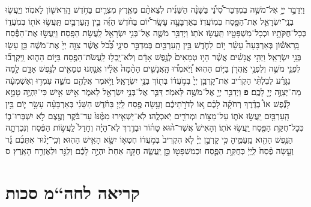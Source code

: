 \documentclass[twoside, openany, parskip=half, 11pt]{book}
\begin{document}
\begin{footnotesize}
\begin{multicols}{2}
\\
\\
וַיְדַבֵּ֣ר יְיָ֣ אֶל־מֹשֶׁ֣ה בְמִדְבַּר־סִ֠ינַ֠י בַּשָּׁנָ֨ה הַשֵּׁנִ֜ית לְצֵאתָ֨ם מֵאֶ֧רֶץ מִצְרַ֛יִם בַּחֹ֥דֶשׁ הָֽרִאשׁ֖וֹן לֵאמֹֽר׃ וְיַֽעֲשׂ֧וּ בְנֵֽי־יִשְׂרָאֵ֛ל אֶת־הַפָּ֖סַח בְּמֽוֹעֲדֽוֹ׃ בְּאַרְבָּעָ֣ה עָשָֽׂר־י֠וֹם בַּחֹ֨דֶשׁ הַזֶּ֜ה בֵּ֧ין הָֽעַרְבַּ֛יִם תַּֽעֲשׂ֥וּ אֹת֖וֹ בְּמֹֽעֲד֑וֹ כְּכָל־חֻקֹּתָ֥יו וּכְכָל־מִשְׁפָּטָ֖יו תַּֽעֲשׂ֥וּ אֹתֽוֹ׃ וַיְדַבֵּ֥ר מֹשֶׁ֛ה אֶל־בְּנֵ֥י יִשְׂרָאֵ֖ל לַֽעֲשׂ֥ת הַפָּֽסַח׃ וַיַּֽעֲשׂ֣וּ אֶת־הַפֶּ֡סַח בָּֽרִאשׁ֡וֹן בְּאַרְבָּעָה֩ עָשָׂ֨ר י֥וֹם לַחֹ֛דֶשׁ בֵּ֥ין הָֽעַרְבַּ֖יִם בְּמִדְבַּ֣ר סִינָ֑י כְּ֠כֹ֠ל אֲשֶׁ֨ר צִוָּ֤ה יְיָ֙ אֶת־מֹשֶׁ֔ה כֵּ֥ן עָשׂ֖וּ בְּנֵ֥י יִשְׂרָאֵֽל׃ 
וַיְהִ֣י אֲנָשִׁ֗ים אֲשֶׁ֨ר הָי֤וּ טְמֵאִים֙ לְנֶ֣פֶשׁ אָדָ֔ם וְלֹא־יָֽכְל֥וּ לַֽעֲשֹׂת־הַפֶּ֖סַח בַּיּ֣וֹם הַה֑וּא וַֽיִּקְרְב֞וּ לִפְנֵ֥י מֹשֶׁ֛ה וְלִפְנֵ֥י אַֽהֲרֹ֖ן בַּיּ֥וֹם הַהֽוּא׃ וַ֠יֹּֽאמְר֠וּ הָֽאֲנָשִׁ֤ים הָהֵ֨מָּה֙ אֵלָ֔יו אֲנַ֥חְנוּ טְמֵאִ֖ים לְנֶ֣פֶשׁ אָדָ֑ם לָ֣מָּה נִגָּרַ֗ע לְבִלְתִּ֨י הַקְרִ֜יב אֶת־קָרְבַּ֤ן יְיָ֙ בְּמֹ֣עֲד֔וֹ בְּת֖וֹךְ בְּנֵ֥י יִשְׂרָאֵֽל׃ וַיֹּ֥אמֶר אֲלֵהֶ֖ם מֹשֶׁ֑ה עִמְד֣וּ וְאֶשְׁמְעָ֔ה מַה־יְּצַוֶּ֥ה יְיָ֖ לָכֶֽם׃ \textbf{פ} 
וַיְדַבֵּ֥ר יְיָ֖ אֶל־מֹשֶׁ֥ה לֵּאמֹֽר׃ דַּבֵּ֛ר אֶל־בְּנֵ֥י יִשְׂרָאֵ֖ל לֵאמֹ֑ר אִ֣ישׁ אִ֣ישׁ כִּי־יִֽהְיֶ֥ה טָמֵ֣א לָנֶ֡פֶשׁ אוֹ֩ בְדֶ֨רֶךְ רְחֹקָ֜הֹ לָכֶ֗ם א֚וֹ לְדֹרֹ֣תֵיכֶ֔ם וְעָ֥שָׂה פֶ֖סַח לַֽיְיָ׃ בַּחֹ֨דֶשׁ הַשֵּׁנִ֜י בְּאַרְבָּעָ֨ה עָשָׂ֥ר י֛וֹם בֵּ֥ין הָֽעַרְבַּ֖יִם יַֽעֲשׂ֣וּ אֹת֑וֹ עַל־מַצּ֥וֹת וּמְרֹרִ֖ים יֹֽאכְלֻֽהוּ׃ לֹֽא־יַשְׁאִ֤ירוּ מִמֶּ֨נּוּ֙ עַד־בֹּ֔קֶר וְעֶ֖צֶם לֹ֣א יִשְׁבְּרוּ־ב֑וֹ כְּכָל־חֻקַּ֥ת הַפֶּ֖סַח יַֽעֲשׂ֥וּ אֹתֽוֹ׃ וְהָאִישׁ֩ אֲשֶׁר־ה֨וּא טָה֜וֹר וּבְדֶ֣רֶךְ לֹֽא־הָיָ֗ה וְחָדַל֙ לַֽעֲשׂ֣וֹת הַפֶּ֔סַח וְנִכְרְתָ֛ה הַנֶּ֥פֶשׁ הַהִ֖וא מֵֽעַמֶּ֑יהָ כִּ֣י קָרְבַּ֣ן יְיָ֗ לֹ֤א הִקְרִיב֙ בְּמֹ֣עֲד֔וֹ חֶטְא֥וֹ יִשָּׂ֖א הָאִ֥ישׁ הַהֽוּא׃ וְכִֽי־יָג֨וּר אִתְּכֶ֜ם גֵּ֗ר וְעָ֤שָׂה פֶ֨סַח֙ לַֽיְיָ֔ כְּחֻקַּ֥ת הַפֶּ֛סַח וּכְמִשְׁפָּט֖וֹ כֵּ֣ן יַֽעֲשֶׂ֑ה חֻקָּ֤ה אַחַת֙ יִהְיֶ֣ה לָכֶ֔ם וְלַגֵּ֖ר וּלְאֶזְרַ֥ח הָאָֽרֶץ׃ ס		

\end{multicols}

\clearpage

\section[חה“מ סכות]{קריאה לחה“מ סכות}


\end{footnotesize}
\end{document}
